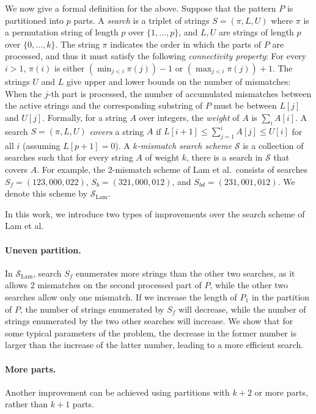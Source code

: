 \documentclass[12pt]{article}
\newcommand{\scheme}{\mathcal{S}}
\newcommand{\schemelam}{\mathcal{S}_{\text{Lam}}}
\newif\iffull
\begin{document}
We now give a formal definition for the above.
Suppose that the pattern $P$ is partitioned into $p$ parts.
A \emph{search} is a triplet of strings $S=(\pi,L,U)$
where $\pi$ is a permutation string of length $p$ over $\{1,\ldots,p\}$,
and $L,U$ are strings of length $p$ over $\{0,\ldots,k\}$.
The string $\pi$ indicates the order in which the parts of $P$ are processed,
and thus it must satisfy the following \emph{connectivity property}:
For every $i>1$,
$\pi(i)$ is either $(\min_{j<i}\pi(j))-1$ or $(\max_{j<i}\pi(j))+1$.
The strings $U$ and $L$ give upper and lower bounds on the number of
mismatches:
When the $j$-th part is processed, the number of accumulated mismatches
between the active strings and the corresponding substring of $P$ must be between
$L[j]$ and $U[j]$.
Formally, for a string $A$ over integers,
the \emph{weight} of $A$ is $\sum_i A[i]$.
A search $S=(\pi,L,U)$ \emph{covers} a string $A$ if
$L[i+1] \leq \sum_{j=1}^i A[j] \leq U[i]$ for all $i$
(assuming $L[p+1]=0$).
A \emph{$k$-mismatch search scheme} $\scheme$ is a collection of
searches such that for every string $A$ of weight $k$,
there is a search in $\scheme$ that covers $A$.
For example, the 2-mismatch scheme of Lam et al.\ consists of
searches $S_f = (123,000,022)$, $S_b = (321,000,012)$,
and $S_{bd} = (231,001,012)$. We denote this scheme by $\schemelam$.

In this work, we introduce two types of improvements over the search scheme of Lam et al.
\paragraph{Uneven partition.}
In $\schemelam$, search $S_f$ enumerates more strings
than the other two searches, as it allows 2 mismatches on the second
processed part
of $P$, while the other two searches allow only one mismatch.
If we increase the length of $P_1$ in the partition of $P$, the
number of strings enumerated by $S_f$ will decrease, while
the number of strings enumerated by the two other searches will increase.
We show that for some typical parameters of the problem, the decrease in the
former number is larger than the increase of the latter number,
leading to a more efficient search. 

\paragraph{More parts.}
Another improvement can be achieved using partitions with $k+2$ or
more parts, rather than $k+1$ parts.
\iffull
We explain in Section~\ref{sec:uneven} why such partitions can
reduce the number of enumerated strings.
\fi
\end{document}
